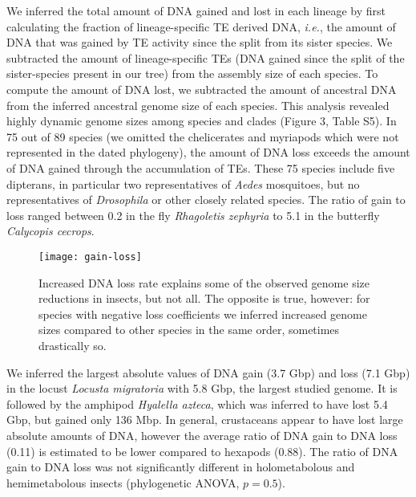 We inferred the total amount of DNA gained and lost in each lineage by
first calculating the fraction of lineage-specific TE derived DNA,
\emph{i.e.}, the amount of DNA that was gained by TE activity since the
split from its sister species. We subtracted the amount of
lineage-specific TEs (DNA gained since the split of the sister-species
present in our tree) from the assembly size of each species. To compute
the amount of DNA lost, we subtracted the amount of ancestral DNA from
the inferred ancestral genome size of each species. This analysis
revealed highly dynamic genome sizes among species and clades (Figure 3,
Table S5). In 75 out of 89 species (we omitted the chelicerates and
myriapods which were not represented in the dated phylogeny), the amount
of DNA loss exceeds the amount of DNA gained through the accumulation of
TEs. These 75 species include five dipterans, in particular two
representatives of \emph{Aedes} mosquitoes, but no representatives of
\emph{Drosophila} or other closely related species. The ratio of gain to
loss ranged between 0.2 in the fly \emph{Rhagoletis zephyria} to 5.1 in
the butterfly \emph{Calycopis cecrops}.

\begin{figure}[h!]
\begin{center}
\texttt{[image: gain-loss]}
\caption[DNA gain and loss rates]{{Increased DNA loss rate explains some of the observed genome size
reductions in insects, but not all. The opposite is true, however: for
species with negative loss coefficients we inferred increased genome
sizes compared to other species in the same order, sometimes drastically
so.
{\label{700745}}%
}}
\end{center}
\end{figure}

We inferred the largest absolute values of DNA gain (3.7 Gbp) and loss
(7.1 Gbp) in the locust \emph{Locusta migratoria} with 5.8 Gbp, the
largest studied genome. It is followed by the amphipod \emph{Hyalella
azteca}, which was inferred to have lost 5.4 Gbp, but gained only 136
Mbp. In general, crustaceans appear to have lost large absolute amounts
of DNA, however the average ratio of DNA gain to DNA loss (0.11) is
estimated to be lower compared to hexapods (0.88). The ratio of DNA gain
to DNA loss was not significantly different in holometabolous and
hemimetabolous insects (phylogenetic ANOVA, \(p = 0.5\)).

